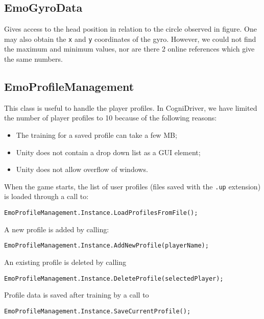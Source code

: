 \subsection{EmoGyroData}
Gives access to the head position in relation to the circle observed in figure. One may also obtain the \texttt{x} and \texttt{y} coordinates of the gyro. However, we could not find the maximum and minimum values, nor are there 2 online references which give the same numbers.

\subsection{EmoProfileManagement}
This class is useful to handle the player profiles. In CogniDriver, we have limited the number of player profiles to 10 because of the following reasons:
\begin{itemize}
	\item The training for a saved profile can take a few MB;
	\item Unity does not contain a drop down list as a GUI element;
	\item Unity does not allow overflow of windows.
\end{itemize}

When the game starts, the list of user profiles (files saved with the \texttt{.up} extension) is loaded through a call to:

\begin{Verbatim}[frame=single, framesep=3mm]
EmoProfileManagement.Instance.LoadProfilesFromFile();
\end{Verbatim}

A new profile is added by calling:

\begin{Verbatim}[frame=single, framesep=3mm]
EmoProfileManagement.Instance.AddNewProfile(playerName);
\end{Verbatim}

An existing profile is deleted by calling

\begin{Verbatim}[frame=single, framesep=3mm]
EmoProfileManagement.Instance.DeleteProfile(selectedPlayer);
\end{Verbatim}

Profile data is saved after training by a call to 

\begin{Verbatim}[frame=single, framesep=3mm]
EmoProfileManagement.Instance.SaveCurrentProfile();
\end{Verbatim}

